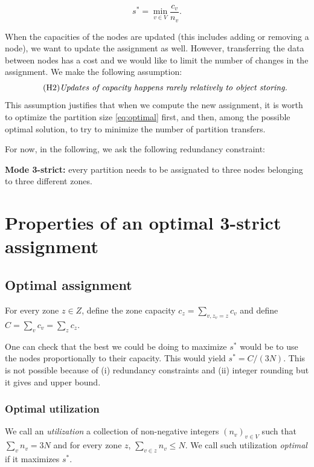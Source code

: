 \documentclass[]{article}
\begin{document}
\begin{equation}
	\label{eq:optimal}
	\tag{OPT}
s^* = \min_{v \in V} \frac{c_v}{n_v}.
\end{equation}

When the capacities of the nodes are updated (this includes adding or removing a node), we want to update the assignment as well. However, transferring the data between nodes has a cost and we would like to limit the number of changes in the assignment. We make the following assumption:
\begin{equation}
	\tag{H2}
	\text{\emph{Updates of capacity happens rarely relatively to object storing.}}
\end{equation}
This assumption justifies that when we compute the new assignment, it is worth to optimize the partition size \eqref{eq:optimal} first, and then, among the possible optimal solution, to try to minimize the number of partition transfers.

For now, in the following, we ask the following redundancy constraint:

\textbf{Mode 3-strict:}  every partition needs to be assignated to three nodes belonging to three different zones.

\section{Properties of an optimal 3-strict assignment}

\subsection{Optimal assignment}
\label{sec:opt_assign}

For every zone $z\in Z$, define the zone capacity $c_z = \sum_{v, z_v=z} c_v$ and define $C = \sum_v c_v = \sum_z c_z$.

One can check that the best we could be doing to maximize $s^*$ would be to use the nodes proportionally to their capacity. This would yield $s^*=C/(3N)$. This is not possible because of (i) redundancy constraints and (ii) integer rounding but it gives and upper bound. 

\subsubsection*{Optimal utilization}

We call an \emph{utilization} a collection of non-negative integers $(n_v)_{v\in V}$ such that $\sum_v n_v = 3N$ and for every zone $z$, $\sum_{v\in z} n_v \le N$. We call such utilization \emph{optimal} if it maximizes $s^*$.
\end{document}

